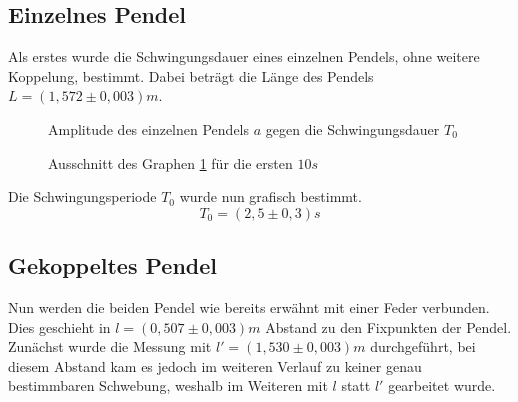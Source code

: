 \subsection{Einzelnes Pendel}
Als erstes wurde die Schwingungsdauer eines einzelnen Pendels, ohne weitere Koppelung, bestimmt. Dabei beträgt die Länge des Pendels $L = (1,572 \pm 0,003) m$.

\begin{figure}[H]
  \centering
  \caption{Amplitude des einzelnen Pendels $a$ gegen die Schwingungsdauer $T_0$ }
  \label{fig:einzelschwingung}
\end{figure}
\begin{figure}[H]
  \centering
  \caption{Ausschnitt des Graphen \ref{fig:einzelschwingung} für die ersten $10 s$ }
  \label{fig:durchbiegung}
\end{figure}
Die Schwingungsperiode $T_0$ wurde nun grafisch bestimmt.
\begin{equation}
 T_0=(2,5\pm 0,3)s
\end{equation}
\subsection{Gekoppeltes Pendel}
Nun werden die beiden Pendel wie bereits erwähnt mit einer Feder verbunden. Dies geschieht in $l=(0,507 \pm 0,003)m$ Abstand zu den Fixpunkten der Pendel. Zunächst wurde die Messung mit $l'=(1,530 \pm 0,003)m$ durchgeführt, bei diesem Abstand kam es jedoch im weiteren Verlauf zu keiner genau bestimmbaren Schwebung, weshalb im Weiteren mit $l$ statt $l'$ gearbeitet wurde.

